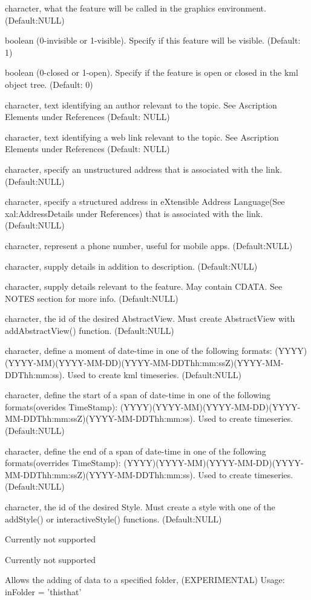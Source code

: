 \documentclass[a4paper]{book}
\begin{document}
\begin{Arguments}
\begin{ldescription}
\item[\code{name}] character, what the feature will be called in the graphics environment. (Default:NULL) 
\item[\code{visibility}] boolean (0-invisible or 1-visible). Specify if this feature will be visible. (Default: 1)
\item[\code{open}]  boolean (0-closed or 1-open). Specify if the feature is open or closed in the kml object tree. (Default: 0)
\item[\code{atomauthor}]  character, text identifying an author relevant to the topic. See Ascription Elements under References (Default: NULL) 
\item[\code{atomlinkhref}] character, text identifying a web link relevant to the topic. See Ascription Elements under References (Default: NULL) 
\item[\code{address}] character, specify an unstructured address that is associated with the link. (Default:NULL) 
\item[\code{xalAddressDetails}] character, specify a structured address in eXtensible Address Language(See xal:AddressDetails under References) that is associated with the link. (Default:NULL) 
\item[\code{phoneNumber}]  character, represent a phone number, useful for mobile apps. (Default:NULL) 
\item[\code{Snippet}] character, supply details in addition to description. (Default:NULL)
\item[\code{description}] character, supply details relevant to the feature. May contain CDATA. See NOTES section for more info. (Default:NULL)
\item[\code{AbstractView}] character, the id of the desired AbstractView. Must create AbstractView with addAbstractView() function. (Default:NULL)
\item[\code{TimeStamp}]  character, define a moment of date-time in one of the following formats: (YYYY)(YYYY-MM)(YYYY-MM-DD)(YYYY-MM-DDThh:mm:ssZ)(YYYY-MM-DDThh:mm:ss). Used to create kml timeseries. (Default:NULL)
\item[\code{TimeSpanStart}]  character, define the start of a span of date-time in one of the following formats(overides TimeStamp): (YYYY)(YYYY-MM)(YYYY-MM-DD)(YYYY-MM-DDThh:mm:ssZ)(YYYY-MM-DDThh:mm:ss). Used to create timeseries. (Default:NULL)
\item[\code{TimeSpanEnd}]  character, define the end of a span of date-time in one of the following formats(overrides TimeStamp): (YYYY)(YYYY-MM)(YYYY-MM-DD)(YYYY-MM-DDThh:mm:ssZ)(YYYY-MM-DDThh:mm:ss). Used to create timeseries. (Default:NULL) 
\item[\code{styleUrl}] character, the id of the desired Style. Must create a style with one of the addStyle() or interactiveStyle() functions. (Default:NULL)
\item[\code{Region}] Currently not supported
\item[\code{ExtendedData}] Currently not supported
\item[\code{inFolder}] Allows the adding of data to a specified folder, (EXPERIMENTAL) Usage: inFolder = 'this\bsl{}that'   



\end{ldescription}
\end{Arguments}
\end{document}
